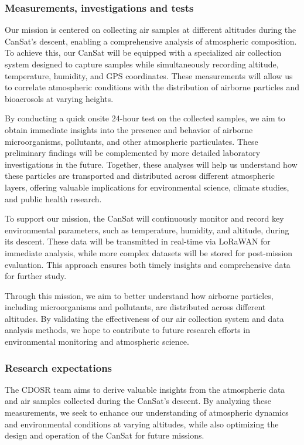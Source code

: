 \subsubsection{Measurements, investigations and tests}


Our mission is centered on collecting air samples at different altitudes during the CanSat’s descent, enabling a comprehensive analysis of atmospheric composition. To achieve this, our CanSat will be equipped with a specialized air collection system designed to capture samples while simultaneously recording altitude, temperature, humidity, and GPS coordinates. These measurements will allow us to correlate atmospheric conditions with the distribution of airborne particles and bioaerosols at varying heights.

By conducting a quick onsite 24-hour test on the collected samples, we aim to obtain immediate insights into the presence and behavior of airborne microorganisms, pollutants, and other atmospheric particulates. These preliminary findings will be complemented by more detailed laboratory investigations in the future. Together, these analyses will help us understand how these particles are transported and distributed across different atmospheric layers, offering valuable implications for environmental science, climate studies, and public health research.

To support our mission, the CanSat will continuously monitor and record key environmental parameters, such as temperature, humidity, and altitude, during its descent. These data will be transmitted in real-time via LoRaWAN for immediate analysis, while more complex datasets will be stored for post-mission evaluation. This approach ensures both timely insights and comprehensive data for further study.

Through this mission, we aim to better understand how airborne particles, including microorganisms and pollutants, are distributed across different altitudes. By validating the effectiveness of our air collection system and data analysis methods, we hope to contribute to future research efforts in environmental monitoring and atmospheric science.

\subsubsection{Research expectations}

The CDOSR team aims to derive valuable insights from the atmospheric data and air samples collected during the CanSat’s descent. By analyzing these measurements, we seek to enhance our understanding of atmospheric dynamics and environmental conditions at varying altitudes, while also optimizing the design and operation of the CanSat for future missions.


